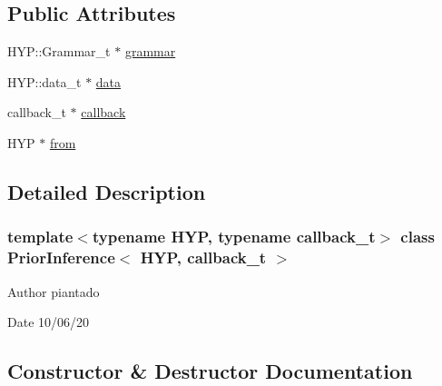 \subsection*{Public Attributes}
\begin{DoxyCompactItemize}
\item 
H\+Y\+P\+::\+Grammar\+\_\+t $\ast$ \hyperlink{class_prior_inference_a43d11fa29f7eba36eebf1de72db3afc4}{grammar}
\item 
H\+Y\+P\+::data\+\_\+t $\ast$ \hyperlink{class_prior_inference_a537a489d953992aca5327899548df8ac}{data}
\item 
callback\+\_\+t $\ast$ \hyperlink{class_prior_inference_a0b71e0bf3b2c27fa97be006a3c3738a0}{callback}
\item 
H\+YP $\ast$ \hyperlink{class_prior_inference_ae583f068334550a1e73fdf453359b7d3}{from}
\end{DoxyCompactItemize}


\subsection{Detailed Description}
\subsubsection*{template$<$typename H\+YP, typename callback\+\_\+t$>$\newline
class Prior\+Inference$<$ H\+Y\+P, callback\+\_\+t $>$}

\begin{DoxyAuthor}{Author}
piantado 
\end{DoxyAuthor}
\begin{DoxyDate}{Date}
10/06/20 
\end{DoxyDate}


\subsection{Constructor \& Destructor Documentation}
\mbox{\label{class_prior_inference_af4726e923dcecf83533ba806b27f37ea}} 
